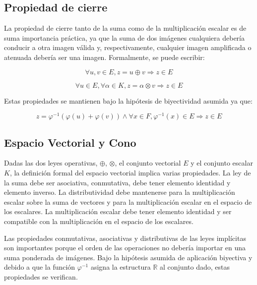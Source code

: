 \subsection{Propiedad de cierre}

La propiedad de cierre tanto de la suma como de la multiplicación escalar es de suma importancia práctica, ya que la suma de dos imágenes cualquiera debería conducir a otra imagen válida y, respectivamente, cualquier imagen amplificada o atenuada debería ser una imagen. Formalmente, se puede escribir:

\begin{equation}
	\forall u,v \in E, z = u \oplus v \Rightarrow z \in E
\end{equation}

\begin{equation}
	\forall u \in E, \forall \alpha \in K, z=\alpha \otimes v \Rightarrow z \in E
\end{equation}

Estas propiedades se mantienen bajo la hipótesis de biyectividad asumida ya que: 

\begin{equation}
	z=\varphi^{-1}(\varphi(u)+\varphi(v)) \land \forall x \in F, \varphi^{-1}(x) \in E \Rightarrow z \in E
\end{equation}

\subsection{Espacio Vectorial y Cono}
Dadas las dos leyes operativas, $\oplus$, $\otimes$, el conjunto vectorial $E$ y el conjunto escalar $K$, la definición formal del espacio vectorial implica varias propiedades. La ley de la suma debe ser asociativa, conmutativa, debe tener elemento identidad y elemento inverso. La distributividad debe mantenerse para la multiplicación escalar sobre la suma de vectores y para la multiplicación escalar en el espacio de los escalares. La multiplicación escalar debe tener elemento identidad y ser compatible con la multiplicación en el espacio de los escalares.

Las propiedades conmutativas, asociativas y distributivas de las leyes implícitas son importantes porque el orden de las operaciones no debería importar en una suma ponderada de imágenes. Bajo la hipótesis asumida de aplicación biyectiva y debido a que la función $\varphi^{-1}$ asigna la estructura $\mathbb{R}$ al conjunto dado, estas propiedades se verifican.

